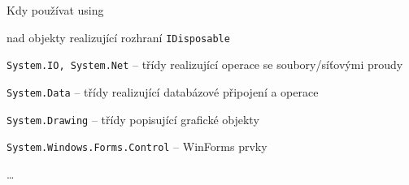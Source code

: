 \begin{frame}[fragile]
\begin{bitemize}{Kdy používat using}
\item nad objekty realizující rozhraní \lstinline|IDisposable|
\item \lstinline|System.IO, System.Net| -- třídy realizující operace se soubory/síťovými proudy
\item \lstinline|System.Data| -- třídy realizující databázové připojení a operace
\item \lstinline|System.Drawing| -- třídy popisující grafické objekty
\item \lstinline|System.Windows.Forms.Control| -- WinForms prvky
\item \ldots
\end{bitemize}
\end{frame}


